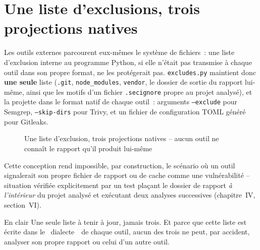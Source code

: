 \documentclass[12pt,a4paper,oneside]{report}
\begin{document}
\section{Une liste d'exclusions, trois projections natives}
Les outils externes parcourent eux-m\^emes le syst\`eme de fichiers~: une liste d'exclusion interne au programme Python, si elle n'\'etait pas transmise \`a chaque outil dans son propre format, ne les prot\'egerait pas. \texttt{excludes.py} maintient donc \textbf{une seule} liste (\texttt{.git}, \texttt{node\_modules}, \texttt{vendor}, le dossier de sortie du rapport lui-m\^eme, ainsi que les motifs d'un fichier \texttt{.secignore} propre au projet analys\'e), et la projette dans le format natif de chaque outil~: arguments \texttt{--exclude} pour Semgrep, \texttt{--skip-dirs} pour Trivy, et un fichier de configuration TOML g\'en\'er\'e pour Gitleaks.

\begin{figure}[H]
\centering
{}
\caption{Une liste d'exclusion, trois projections natives -- aucun outil ne conna\^it le rapport qu'il produit lui-m\^eme}
\label{fig:excludes}
\end{figure}

Cette conception rend impossible, par construction, le sc\'enario o\`u un outil signalerait son propre fichier de rapport ou de cache comme une vuln\'erabilit\'e -- situation v\'erifi\'ee explicitement par un test plaçant le dossier de rapport \emph{\`a l'int\'erieur} du projet analys\'e et ex\'ecutant deux analyses successives (chapitre~IV, section~VI).

\begin{infobox}{En clair}
Une seule liste \`a tenir \`a jour, jamais trois. Et parce que cette liste est \'ecrite dans le \guillemotleft~dialecte~\guillemotright\ de chaque outil, aucun des trois ne peut, par accident, analyser son propre rapport ou celui d'un autre outil.
\end{infobox}
\end{document}
